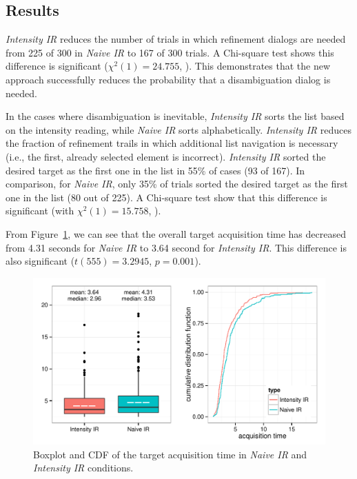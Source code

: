 \subsection{Results}
{\em Intensity IR} reduces the number of trials in which refinement dialogs are needed from 225 of 300 in {\em Naive IR} to 167 of 300 trials. A Chi-square test shows this difference is significant ($\chi^2(1) = 24.755$, ). This demonstrates that the new approach successfully reduces the probability that a disambiguation dialog is needed.

In the cases where disambiguation is inevitable, {\em Intensity IR} sorts the list based on the intensity reading, while {\em Naive IR} sorts alphabetically. {\em Intensity IR} reduces the fraction of refinement trails in which additional list navigation is necessary (i.e., the first, already selected element is incorrect).  {\em Intensity IR} sorted the desired target as the first one in the list in 55\% of cases (93 of 167). In comparison, for {\em Naive IR}, only 35\% of trials sorted the desired target as the first one in the list (80 out of 225). A Chi-square test show that this difference is significant (with $\chi^2(1) = 15.758$, ).

From Figure~\ref{fig:study2}, we can see that the overall target acquisition time has decreased from 4.31 seconds for {\em Naive IR} to 3.64 second for {\em Intensity IR}. This difference is also significant ($t(555)=3.2945$, $p=0.001$).




\begin{figure}[t]
\centering
\includegraphics[width=0.95\columnwidth]{figures/result_study2.pdf}
\caption{Boxplot and CDF of the target acquisition time in {\em Naive IR} and {\em Intensity IR} conditions.}
\label{fig:study2}
\end{figure}

